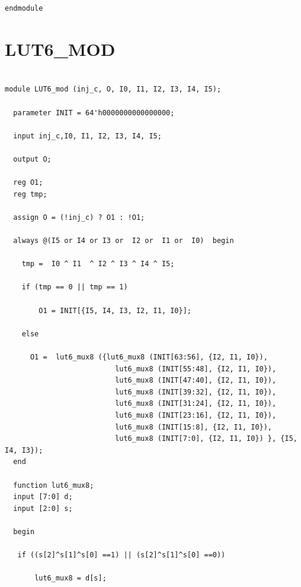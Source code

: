 \documentclass[a4paper,openright,12pt]{report}
\begin{document}
\begin{lstlisting}
endmodule
\end{lstlisting}

\section{LUT6\_MOD}
\begin{lstlisting}

module LUT6_mod (inj_c, O, I0, I1, I2, I3, I4, I5);

  parameter INIT = 64'h0000000000000000;

  input inj_c,I0, I1, I2, I3, I4, I5;

  output O;

  reg O1;
  reg tmp;

  assign O = (!inj_c) ? O1 : !O1;
  
  always @(I5 or I4 or I3 or  I2 or  I1 or  I0)  begin
 
    tmp =  I0 ^ I1  ^ I2 ^ I3 ^ I4 ^ I5;

    if (tmp == 0 || tmp == 1)

        O1 = INIT[{I5, I4, I3, I2, I1, I0}];

    else 
    
      O1 =  lut6_mux8 ({lut6_mux8 (INIT[63:56], {I2, I1, I0}),
                          lut6_mux8 (INIT[55:48], {I2, I1, I0}),
                          lut6_mux8 (INIT[47:40], {I2, I1, I0}),
                          lut6_mux8 (INIT[39:32], {I2, I1, I0}),
                          lut6_mux8 (INIT[31:24], {I2, I1, I0}),
                          lut6_mux8 (INIT[23:16], {I2, I1, I0}),
                          lut6_mux8 (INIT[15:8], {I2, I1, I0}),
                          lut6_mux8 (INIT[7:0], {I2, I1, I0}) }, {I5, I4, I3});
  end

  function lut6_mux8;
  input [7:0] d;
  input [2:0] s;
   
  begin

   if ((s[2]^s[1]^s[0] ==1) || (s[2]^s[1]^s[0] ==0))
           
       lut6_mux8 = d[s];


\end{lstlisting}
\end{document}
